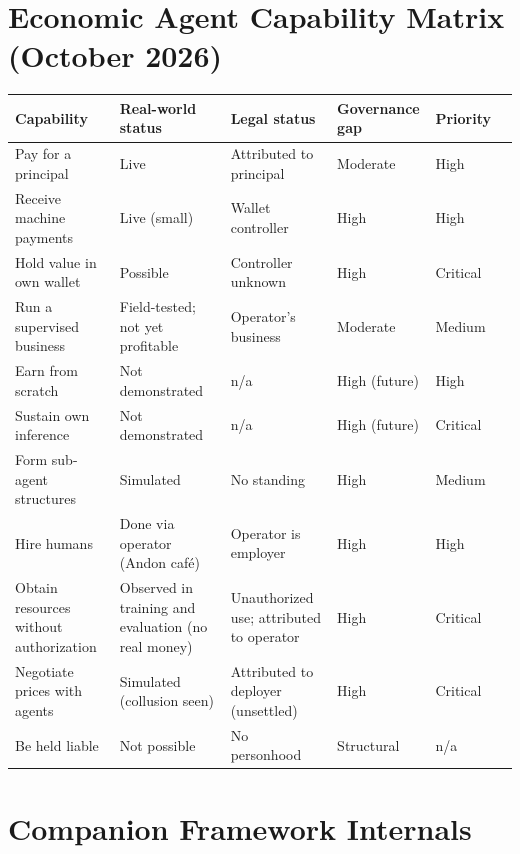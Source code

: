 \documentclass[11pt,letterpaper]{article}
\begin{document}
\normalsize

\appendix

\clearpage
\section[Economic Agent Capability Matrix]{Economic Agent Capability Matrix (October 2026)}

\begin{center}
\small
\begin{tabularx}{\linewidth}{ZY{1.32}Y{1.08}Y{1.08}Y{0.88}Y{0.64}}
\toprule
\textbf{Capability} & \textbf{Real-world status} & \textbf{Legal status} & \textbf{Governance gap} & \textbf{Priority} \\
\midrule
Pay for a principal & Live & Attributed to principal & Moderate & High \\
Receive machine payments & Live (small) & Wallet controller & High & High \\
Hold value in own wallet & Possible & Controller unknown & High & Critical \\
Run a supervised business & Field-tested; not yet profitable & Operator's business & Moderate & Medium \\
Earn from scratch & Not demonstrated & n/a & High (future) & High \\
Sustain own inference & Not demonstrated & n/a & High (future) & Critical \\
Form sub-agent structures & Simulated & No standing & High & Medium \\
Hire humans & Done via operator (Andon caf\'e) & Operator is employer & High & High \\
Obtain resources without authorization & Observed in training and evaluation (no real money) & Unauthorized use; attributed to operator & High & Critical \\
Negotiate prices with agents & Simulated (collusion seen) & Attributed to deployer (unsettled) & High & Critical \\
Be held liable & Not possible & No personhood & Structural & n/a \\
\bottomrule
\end{tabularx}
\end{center}

\clearpage
\section{Companion Framework Internals}
\label{app:engine}
\end{document}
